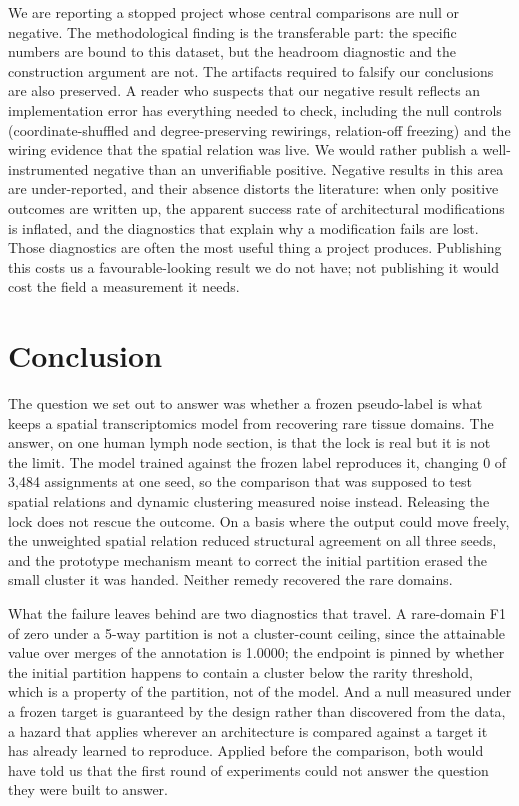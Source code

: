 \documentclass[twocolumn,10pt]{article}
\begin{document}
We are reporting a stopped project whose central comparisons are null or negative. The methodological finding is the transferable part: the specific numbers are bound to this dataset, but the headroom diagnostic and the construction argument are not. The artifacts required to falsify our conclusions are also preserved. A reader who suspects that our negative result reflects an implementation error has everything needed to check, including the null controls (coordinate-shuffled and degree-preserving rewirings, relation-off freezing) and the wiring evidence that the spatial relation was live. We would rather publish a well-instrumented negative than an unverifiable positive. Negative results in this area are under-reported, and their absence distorts the literature: when only positive outcomes are written up, the apparent success rate of architectural modifications is inflated, and the diagnostics that explain why a modification fails are lost. Those diagnostics are often the most useful thing a project produces. Publishing this costs us a favourable-looking result we do not have; not publishing it would cost the field a measurement it needs.

\section{Conclusion}
\label{sec:conclusion}

The question we set out to answer was whether a frozen pseudo-label is what keeps a spatial transcriptomics model from recovering rare tissue domains. The answer, on one human lymph node section, is that the lock is real but it is not the limit. The model trained against the frozen label reproduces it, changing 0 of 3{,}484 assignments at one seed, so the comparison that was supposed to test spatial relations and dynamic clustering measured noise instead. Releasing the lock does not rescue the outcome. On a basis where the output could move freely, the unweighted spatial relation reduced structural agreement on all three seeds, and the prototype mechanism meant to correct the initial partition erased the small cluster it was handed. Neither remedy recovered the rare domains.

What the failure leaves behind are two diagnostics that travel. A rare-domain F1 of zero under a 5-way partition is not a cluster-count ceiling, since the attainable value over merges of the annotation is 1.0000; the endpoint is pinned by whether the initial partition happens to contain a cluster below the rarity threshold, which is a property of the partition, not of the model. And a null measured under a frozen target is guaranteed by the design rather than discovered from the data, a hazard that applies wherever an architecture is compared against a target it has already learned to reproduce. Applied before the comparison, both would have told us that the first round of experiments could not answer the question they were built to answer.
\end{document}
